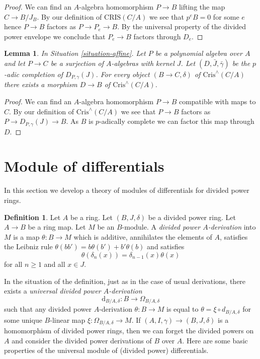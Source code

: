 \documentclass{stacks-project}
\theoremstyle{plain}
\newtheorem{lemma}[subsection]{Lemma}
\theoremstyle{definition}
\newtheorem{definition}[subsection]{Definition}
\theoremstyle{remark}
\numberwithin{equation}{subsection}
\begin{document}
\begin{proof}
We can find an $A$-algebra homomorphism $P \to B$
lifting the map $C \to B/J_B$. By our definition of
$\text{CRIS}(C/A)$ we see that $p^eB = 0$ for
some $e$ hence $P \to B$ factors as $P \to P_e \to B$.
By the universal property of the divided power envelope we
conclude that $P_e \to B$ factors through $D_e$.
\end{proof}

\begin{lemma}
\label{lemma-generator-completion}
In Situation \ref{situation-affine}.
Let $P$ be a polynomial algebra over $A$ and let
$P \to C$ be a surjection of $A$-algebras with kernel $J$.
Let $(D, \bar J, \bar\gamma)$ be the $p$-adic completion of
$D_{P, \gamma}(J)$. For every object $(B \to C, \delta)$ of
$\text{Cris}^\wedge(C/A)$ there
exists a morphism $D \to B$ of $\text{Cris}^\wedge(C/A)$.
\end{lemma}

\begin{proof}
We can find an $A$-algebra homomorphism $P \to B$ compatible
with maps to $C$. By our definition of
$\text{Cris}^\wedge(C/A)$ we see that $P \to B$ factors as
$P \to D_{P, \gamma}(J) \to B$. As $B$ is $p$-adically complete
we can factor this map through $D$.
\end{proof}



\section{Module of differentials}
\label{section-differentials}

\noindent
In this section we develop a theory of modules of differentials
for divided power rings.

\begin{definition}
\label{definition-derivation}
Let $A$ be a ring. Let $(B, J, \delta)$ be a divided power ring.
Let $A \to B$ be a ring map. Let $M$ be an $B$-module.
A {\it divided power $A$-derivation} into $M$ is a map
$\theta : B \to M$ which is additive, annihilates the elements
of $A$, satisfies the Leibniz rule
$\theta(bb') = b\theta(b') + b'\theta(b)$ and satisfies
$$
\theta(\delta_n(x)) = \delta_{n - 1}(x)\theta(x)
$$
for all $n \geq 1$ and all $x \in J$.
\end{definition}

\noindent
In the situation of the definition, just as in the case of usual
derivations, there exists a {\it universal divided power $A$-derivation}
$$
\text{d}_{B/A, \delta} : B \to \Omega_{B/A, \delta}
$$
such that any divided power $A$-derivation $\theta : B \to M$ is equal to
$\theta = \xi \circ d_{B/A, \delta}$ for some unique $B$-linear map
$\xi : \Omega_{B/A, \delta} \to M$. If $(A, I, \gamma) \to (B, J, \delta)$
is a homomorphism of divided power rings, then we can forget the
divided powers on $A$ and consider the divided power derivations of
$B$ over $A$. Here are some basic properties of the universal
module of (divided power) differentials.
\end{document}
